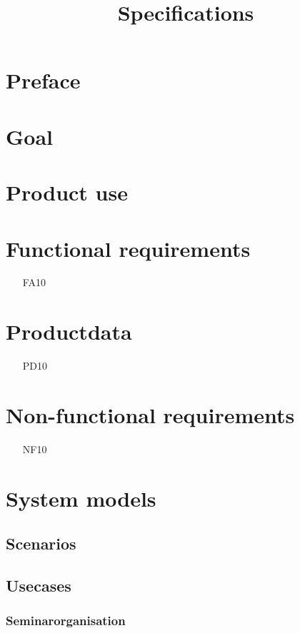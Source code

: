 \documentclass[parskip=full]{scrartcl}
\title{Specifications}
\author{}
\begin{document}
\maketitle

\section{Preface}

\section{Goal}

\section{Product use}

\section{Functional requirements}
\begin{itemize}[nosep]
\item[FA10] 
\end{itemize}

\section{Productdata}
\begin{itemize}[nosep]
\item[PD10] 
\end{itemize}

\section{Non-functional requirements}
\begin{itemize}[nosep]
\item[NF10] 
\end{itemize}

\section{System models}

\subsection{Scenarios}
\subsection{Usecases}
\subsubsection{Seminarorganisation}
\end{document}
